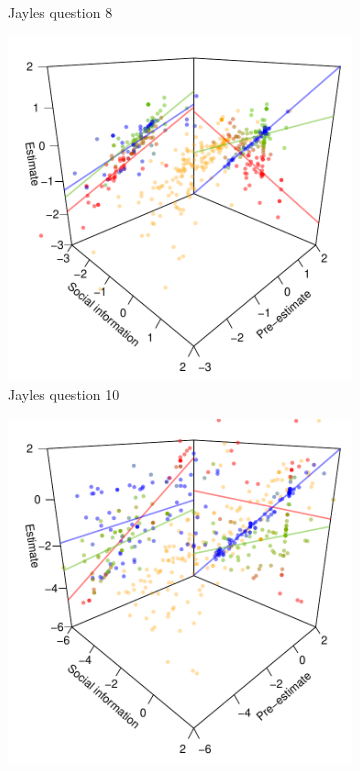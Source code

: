 \documentclass[9pt,twoside,lineno]{pnas-new}
\begin{document}
\begin{figure}[htbp]
\begin{subfigure}[b]{.24\textwidth}
		\caption{Jayles question 8}
	\end{subfigure}
	\begin{subfigure}[b]{.24\textwidth}
		\includegraphics[width=\textwidth]{../plots/jayles10_vs_xp3d.pdf}
		\caption{Jayles question 10}
	\end{subfigure}
	\begin{subfigure}[b]{.24\textwidth}
		\includegraphics[width=\textwidth]{../plots/jayles23_vs_xp3d.pdf}

\end{subfigure}
\end{figure}
\end{document}
